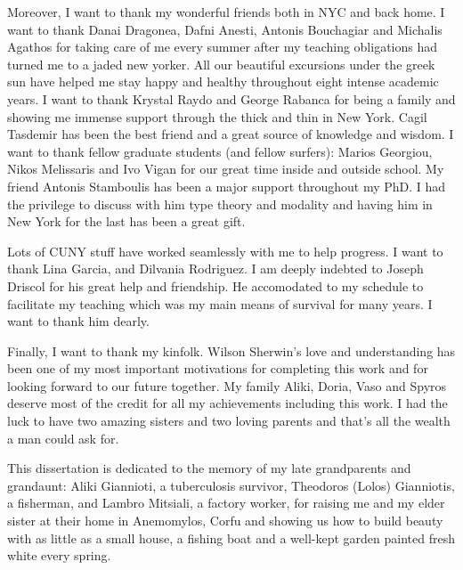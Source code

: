 Moreover, I want to thank my wonderful friends both in NYC and back home. I want to thank Danai Dragonea, Dafni Anesti, Antonis Bouchagiar 
and Michalis Agathos for taking care of me every summer after my teaching obligations
had turned me to a jaded new yorker. All our beautiful excursions under the
greek sun have helped me stay happy and healthy throughout eight intense academic years.
I want to thank Krystal Raydo and George Rabanca for being a family and showing me immense support
through the thick and thin in New York. 
Cagil Tasdemir has been the best friend and a great source of knowledge and wisdom.
I want to thank fellow graduate students (and fellow surfers): Marios Georgiou,
Nikos Melissaris and Ivo Vigan for our great time inside and outside school.
My friend Antonis Stamboulis has been a major support throughout my PhD. 
I had the privilege to discuss with him type theory and modality and having him in New York
for the last has been a great gift. 

Lots of   CUNY stuff have worked seamlessly with me to help progress.
I want to thank Lina Garcia, and Dilvania Rodriguez. I am deeply indebted to Joseph Driscol for his great
help and friendship. He accomodated to my schedule to facilitate my teaching which was 
my main means of survival for many years.  I want to thank him dearly.


Finally, I want to thank my kinfolk. Wilson Sherwin's love and understanding has been one of my
most important motivations for completing this work and for looking forward to our future together.
My family Aliki, Doria, Vaso and Spyros deserve most of the credit for all my achievements including
this work. I had the luck to have two amazing sisters and two loving parents and that's all the wealth 
a man could ask for. 

This dissertation is dedicated to the memory of my late grandparents and grandaunt: 
Aliki Giannioti, a tuberculosis survivor, Theodoros (Lolos) Gianniotis, a fisherman, and
Lambro Mitsiali, a factory  worker, for raising me and my elder sister 
at their home in Anemomylos, Corfu and showing us how to build beauty with as little as
a small house, a fishing boat and a well-kept garden painted fresh white every 
spring.